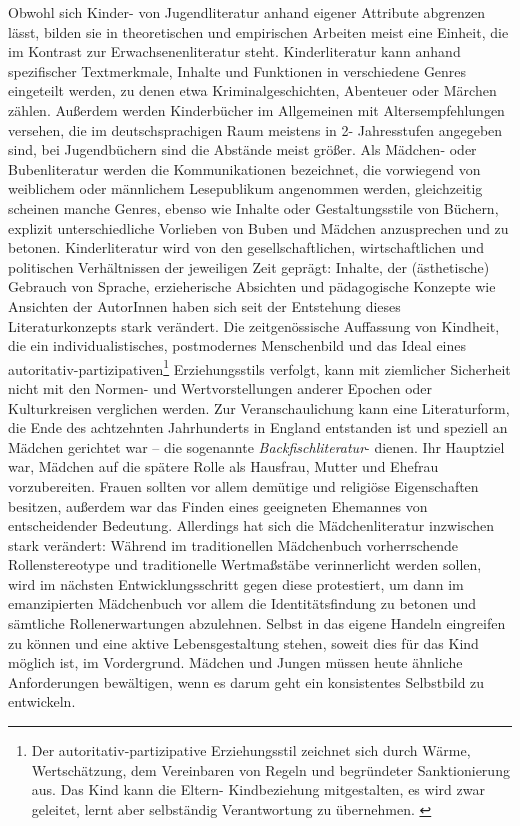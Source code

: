 Obwohl sich Kinder- von Jugendliteratur anhand eigener Attribute abgrenzen lässt, bilden sie in theoretischen und empirischen Arbeiten meist eine Einheit, die im Kontrast zur Erwachsenenliteratur steht. Kinderliteratur kann anhand spezifischer Textmerkmale, Inhalte und Funktionen in verschiedene Genres  eingeteilt werden, zu denen etwa Kriminalgeschichten, Abenteuer oder Märchen zählen.  Außerdem werden Kinderbücher  im Allgemeinen mit Altersempfehlungen versehen, die im deutschsprachigen Raum meistens in 2- Jahresstufen angegeben sind, bei Jugendbüchern sind die Abstände meist größer. \parencite[10]{Ewers2011}
Als Mädchen- oder Bubenliteratur werden die Kommunikationen bezeichnet, die vorwiegend von  weiblichem oder männlichem Lesepublikum angenommen werden, gleichzeitig  scheinen manche Genres, ebenso wie Inhalte oder Gestaltungsstile von Büchern, explizit unterschiedliche Vorlieben von Buben und Mädchen anzusprechen und zu betonen.
Kinderliteratur wird von den gesellschaftlichen, wirtschaftlichen und politischen Verhältnissen der jeweiligen Zeit geprägt: Inhalte, der (ästhetische) Gebrauch von Sprache, erzieherische Absichten und pädagogische Konzepte wie Ansichten der AutorInnen haben sich seit der Entstehung dieses Literaturkonzepts stark verändert.  Die zeitgenössische Auffassung von Kindheit, die ein individualistisches, postmodernes Menschenbild und das Ideal eines autoritativ-partizipativen\footnote{Der autoritativ-partizipative Erziehungsstil  zeichnet sich durch Wärme, Wertschätzung, dem Vereinbaren von Regeln und begründeter Sanktionierung aus. Das Kind kann die Eltern- Kindbeziehung mitgestalten, es wird zwar geleitet, lernt aber selbständig Verantwortung zu übernehmen. \parencite[35]{Kuttler2009}} Erziehungsstils verfolgt, kann mit ziemlicher Sicherheit nicht mit den Normen- und Wertvorstellungen anderer Epochen oder Kulturkreisen verglichen werden. 
Zur Veranschaulichung kann eine Literaturform, die Ende des achtzehnten Jahrhunderts in England entstanden ist und speziell an Mädchen gerichtet war – die sogenannte  \emph{Backfischliteratur}- dienen. Ihr Hauptziel war, Mädchen auf die spätere Rolle als Hausfrau, Mutter und Ehefrau vorzubereiten. Frauen sollten vor allem demütige und religiöse Eigenschaften besitzen, außerdem war das Finden eines geeigneten Ehemannes von entscheidender Bedeutung. Allerdings hat sich die Mädchenliteratur inzwischen stark verändert: Während im traditionellen Mädchenbuch vorherrschende Rollenstereotype und traditionelle Wertmaßstäbe verinnerlicht werden sollen, wird im nächsten Entwicklungsschritt gegen diese protestiert, um dann im emanzipierten Mädchenbuch vor allem die Identitätsfindung zu betonen und sämtliche Rollenerwartungen abzulehnen. Selbst in das eigene Handeln eingreifen zu können und eine aktive Lebensgestaltung stehen, soweit dies für das Kind möglich ist, im Vordergrund. Mädchen und Jungen müssen heute ähnliche Anforderungen bewältigen, wenn es darum geht ein konsistentes Selbstbild zu entwickeln. 


